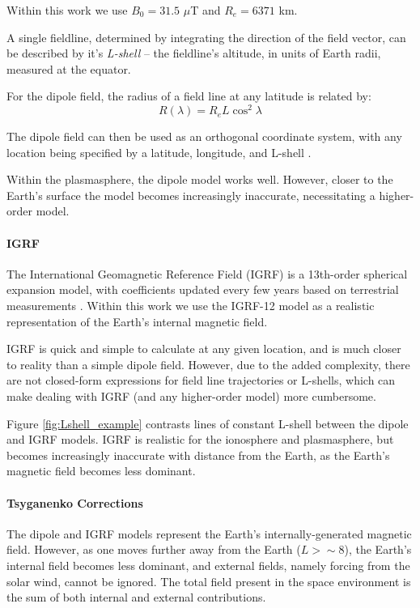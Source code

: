 Within this work we use $B_0 = 31.5$ $\mu$T and $R_e=6371$ km.

A single fieldline, determined by integrating the direction of the field vector, can be described by it's \emph{L-shell} -- the fieldline's altitude, in units of Earth radii, measured at the equator. 

For the dipole field, the radius of a field line at any latitude is related by:
\begin{equation}
R(\lambda) = R_e L \cos^2 \lambda
\end{equation}


The dipole field can then be used as an orthogonal coordinate system, with any location being specified by a latitude, longitude, and L-shell \citep{McIlwain1961}. 

Within the plasmasphere, the dipole model works well. However, closer to the Earth's surface the model becomes increasingly inaccurate, necessitating a higher-order model.
\paragraph{IGRF}
The International Geomagnetic Reference Field (IGRF) is a 13th-order spherical expansion model, with coefficients updated every few years based on terrestrial measurements \citep{Thebault2015}. Within this work we use the IGRF-12 model as a realistic representation of the Earth's internal magnetic field.

IGRF is quick and simple to calculate at any given location, and is much closer to reality than a simple dipole field. However, due to the added complexity, there are not closed-form expressions for field line trajectories or L-shells, which can make dealing with IGRF (and any higher-order model) more cumbersome.

Figure \ref{fig:Lshell_example} contrasts lines of constant L-shell between the dipole and IGRF models. IGRF is realistic for the ionosphere and plasmasphere, but becomes increasingly inaccurate with distance from the Earth, as the Earth's magnetic field becomes less dominant.

\paragraph{Tsyganenko Corrections}
The dipole and IGRF models represent the Earth's internally-generated magnetic field. However, as one moves further away from the Earth ($L > \sim 8$), the Earth's internal field becomes less dominant, and external fields, namely forcing from the solar wind, cannot be ignored. The total field present in the space environment is the sum of both internal and external contributions.

